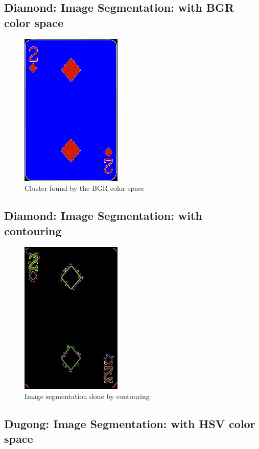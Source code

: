 \documentclass[conference]{IEEEtran}
\begin{document}
\subsection{Diamond: Image Segmentation: with BGR color space}
\begin{figure}[htp]
\includegraphics[width=0.2\linewidth]{../programme/results/Task_4/diamond/BGR/image_2.jpg}
\centering
\caption{Cluster found by the BGR color space}
\label{Cluster found by the BGR color space}
\end{figure}

\subsection{Diamond: Image Segmentation: with contouring}
\begin{figure}[htp]
\includegraphics[width=0.2\linewidth]{../programme/results/Task_4/diamond/contours/image_0.jpg}
\centering
\caption{Image segmentation done by contouring}
\label{Image segmentation done by contouring}
\end{figure}

\subsection{Dugong: Image Segmentation: with HSV color space}
\end{document}
